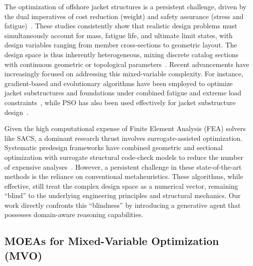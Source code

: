 \documentclass[preprint,12pt]{elsarticle}
\begin{document}
The optimization of offshore jacket structures is a persistent challenge, driven by the dual imperatives of cost reduction (weight) and safety assurance (stress and fatigue)~\citep{savsani2021topology,zheng2023efficient,oest2017structural,asgari2021design,chew2016analytical,marjan2023topology}. These studies consistently show that realistic design problems must simultaneously account for mass, fatigue life, and ultimate limit states, with design variables ranging from member cross-sections to geometric layout. The design space is thus inherently heterogeneous, mixing discrete catalog sections with continuous geometric or topological parameters~\citep{hafele2018systematic}. Recent advancements have increasingly focused on addressing this mixed-variable complexity. For instance, gradient-based and evolutionary algorithms have been employed to optimize jacket substructures and foundations under combined fatigue and extreme load constraints~\citep{oest2017structural,asgari2021design,chew2016analytical,marjan2023topology}, while PSO has also been used effectively for jacket substructure design~\citep{benitez2025pso}.

Given the high computational expense of Finite Element Analysis (FEA) solvers like SACS, a dominant research thrust involves surrogate-assisted optimization. Systematic predesign frameworks have combined geometric and sectional optimization with surrogate structural code-check models to reduce the number of expensive analyses~\citep{hafele2018systematic}. However, a persistent challenge in these state-of-the-art methods is the reliance on conventional metaheuristics. These algorithms, while effective, still treat the complex design space as a numerical vector, remaining ``blind'' to the underlying engineering principles and structural mechanics. Our work directly confronts this ``blindness'' by introducing a generative agent that possesses domain-aware reasoning capabilities.

\subsection{MOEAs for Mixed-Variable Optimization (MVO)}
\end{document}
